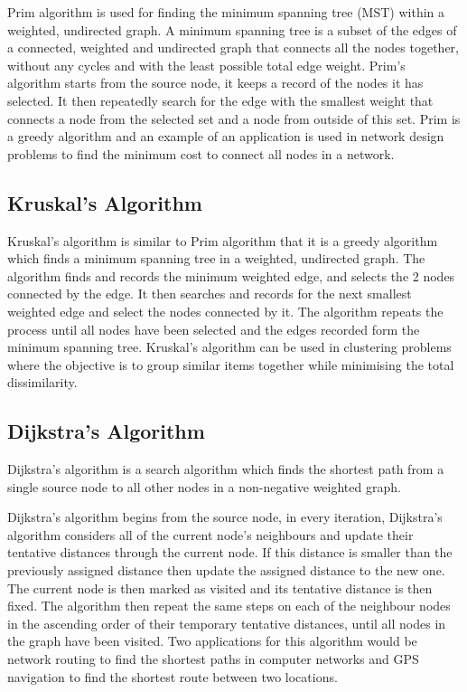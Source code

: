 Prim algorithm is used for finding the minimum spanning tree (MST) within a weighted, undirected graph. A minimum spanning tree is a subset of the edges of a connected, weighted and undirected graph that connects all the nodes together, without any cycles and with the least possible total edge weight. Prim's algorithm starts from the source node, it keeps a record of the nodes it has selected. It then repeatedly search for the edge with the smallest weight that connects a node from the selected set and a node from outside of this set. Prim is a greedy algorithm and an example of an application is used in network design problems to find the minimum cost to connect all nodes in a network.

\subsection{Kruskal's Algorithm}

Kruskal's algorithm is similar to Prim algorithm that it is a greedy algorithm which finds a minimum spanning tree in a weighted, undirected graph. The algorithm finds and records the minimum weighted edge, and selects the 2 nodes connected by the edge. It then searches and records for the next smallest weighted edge and select the nodes connected by it. The algorithm repeats the process until all nodes have been selected and the edges recorded form the minimum spanning tree. Kruskal's algorithm can be used in clustering problems where the objective is to group similar items together while minimising the total dissimilarity.

\subsection{Dijkstra's Algorithm} \label{dijkstra}

Dijkstra's algorithm is a search algorithm which finds the shortest path from a single source node to all other nodes in a non-negative weighted graph.

Dijkstra's algorithm begins from the source node, in every iteration, Dijkstra's algorithm considers all of the current node's neighbours and update their tentative distances through the current node. If this distance is smaller than the previously assigned distance then update the assigned distance to the new one. The current node is then marked as visited and its tentative distance is then fixed. The algorithm then repeat the same steps on each of the neighbour nodes in the ascending order of their temporary tentative distances, until all nodes in the graph have been visited. Two applications for this algorithm would be network routing to find the shortest paths in computer networks and GPS navigation to find the shortest route between two locations.